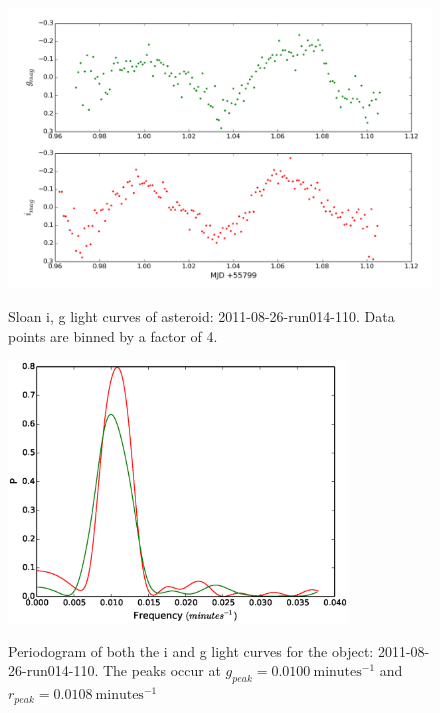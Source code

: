\begin{figure}
  \center
  \includegraphics[width=140mm]{images/2011-08-26-run014-110-lightcurve-bin4.png} 
  \label{fig:2011-08-26-run014-110}
  \caption{Sloan i, g light curves of asteroid: 2011-08-26-run014-110. Data points are binned by a factor of 4.}
\end{figure}


\begin{figure}
  \center
  \includegraphics[width=90mm]{images/2011-08-26-run014-110-pgram-bin4.eps} 
  \label{fig:2013-07-21-run010-23}
  \caption{Periodogram of both the i and g light curves for the object: 2011-08-26-run014-110. The peaks occur at $g_{peak} = 0.0100 \ \mbox{minutes}^{-1}$ and  $r_{peak} = 0.0108\ \mbox{minutes}^{-1}$ }
\end{figure}


